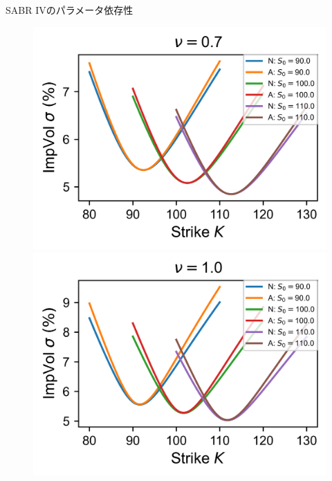 \documentclass[dvipdfmx,9pt]{beamer}
\begin{document}
\begin{frame}{SABR IVのパラメータ依存性}
  \begin{figure}
    \begin{minipage}[b]{0.48\linewidth}
      \raggedleft
      \includegraphics[width=0.7\linewidth]{image/volvol/SABR_graph_0.7.png}
    \end{minipage}
    \hfill
    \begin{minipage}[b]{0.48\linewidth}
      \raggedright
      \includegraphics[width=0.7\linewidth]{image/volvol/SABR_graph_1.0.png}
    \end{minipage}
  \end{figure}

\end{frame}
\end{document}
